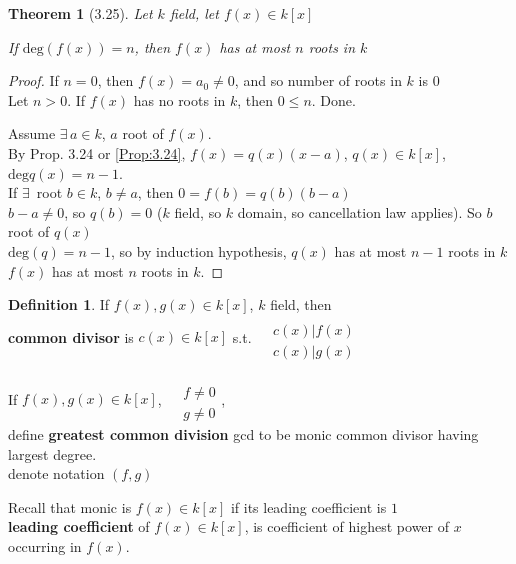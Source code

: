\documentclass[twoside,landscape]{amsart}
\theoremstyle{plain}
\newtheorem{theorem}{Theorem}
\theoremstyle{definition}
\newtheorem{definition}{Definition}
\theoremstyle{remark}
\begin{document}
\begin{multicols*}{2}
\begin{theorem}[3.25]
Let $k$ field, let $f(x) \in k[x]$

If $\text{deg}(f(x)) = n$, then $f(x)$ has at most $n$ roots in $k$
\end{theorem}

\begin{proof}
  If $n=0$, then $f(x)=a_0 \neq 0$, and so number of roots in $k$ is $0$ \\
Let $n> 0$. If $f(x)$ has no roots in $k$, then $0\leq n$. Done.  

Assume $\exists \, a \in k$, $a$ root of $f(x)$.  \\
\phantom{Assume} By Prop. 3.24 or \ref{Prop:3.24}, $f(x) = q(x)(x-a)$, $q(x) \in k[x]$, $\text{deg}q(x) = n-1$.  \\
\phantom{Assume By} If $\exists \, $ root $b\in k$, $b\neq a$, then $0=f(b)=  q(b)(b-a)$ \\
\phantom{Assume By} $b-a \neq 0$, so $q(b) =0$ ($k$ field, so $k$ domain, so cancellation law applies).  So $b$ root of $q(x)$ \\
\phantom{Assume By} $\text{deg}(q) =n-1$, so by induction hypothesis, $q(x)$ has at most $n-1$ roots in $k$\\
\phantom{Assume By} $f(x)$ has at most $n$ roots in $k$.  


\end{proof}


\begin{definition}
  If $f(x),g(x) \in k[x]$, $k$ field, then \\
\textbf{common divisor} is $c(x) \in k[x]$ s.t. $\begin{aligned} & \quad \\
  & c(x) | f(x) \\
  & c(x) | g(x) \end{aligned}$

If $f(x),g(x) \in k[x]$, $\begin{aligned} & \quad \\
& f\neq 0 \\
  & g \neq 0 \end{aligned}$,  \\
define \textbf{greatest common division } gcd to be monic common divisor having largest degree. \\
denote notation $(f,g)$
\end{definition}
Recall that monic is $f(x) \in k[x]$ if its leading coefficient is $1$ \\
\textbf{leading coefficient} of $f(x) \in k[x]$, is coefficient of highest power of $x$ occurring in $f(x)$.  



\end{multicols*}
\end{document}

